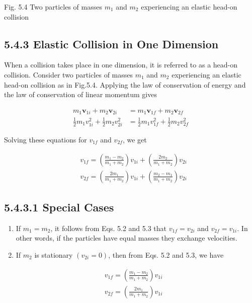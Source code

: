 \documentclass[10pt]{article}
\begin{document}
Fig. 5.4 Two particles of masses $m_{1}$ and $m_{2}$ experiencing an elastic head-on collision

\subsection*{5.4.3 Elastic Collision in One Dimension}
When a collision takes place in one dimension, it is referred to as a head-on collision. Consider two particles of masses $m_{1}$ and $m_{2}$ experiencing an elastic head-on collision as in Fig.5.4. Applying the law of conservation of energy and the law of conservation of linear momentum gives

$$
\begin{aligned}
m_{1} \mathbf{v}_{1 i}+m_{2} \mathbf{v}_{2 i} & =m_{1} \mathbf{v}_{1 f}+m_{2} \mathbf{v}_{2 f} \\
\frac{1}{2} m_{1} v_{1 i}^{2}+\frac{1}{2} m_{2} v_{2 i}^{2} & =\frac{1}{2} m_{1} v_{1 f}^{2}+\frac{1}{2} m_{2} v_{2 f}^{2}
\end{aligned}
$$

Solving these equations for $v_{1 f}$ and $v_{2 f}$, we get


\begin{align*}
& v_{1 f}=\left(\frac{m_{1}-m_{2}}{m_{1}+m_{2}}\right) v_{1 i}+\left(\frac{2 m_{2}}{m_{1}+m_{2}}\right) v_{2 i}  \tag{5.2}\\
& v_{2 f}=\left(\frac{2 m_{1}}{m_{1}+m_{2}}\right) v_{1 i}+\left(\frac{m_{2}-m_{1}}{m_{1}+m_{2}}\right) v_{2 i} \tag{5.3}
\end{align*}


\subsection*{5.4.3.1 Special Cases}
\begin{enumerate}
  \item If $m_{1}=m_{2}$, it follows from Eqs. 5.2 and 5.3 that $v_{1 f}=v_{2 i}$ and $v_{2 f}=v_{1 i}$. In other words, if the particles have equal masses they exchange velocities.
  \item If $m_{2}$ is stationary $\left(v_{2 i}=0\right)$, then from Eqs. 5.2 and 5.3, we have
\end{enumerate}


\begin{align*}
& v_{1 f}=\left(\frac{m_{1}-m_{2}}{m_{1}+m_{2}}\right) v_{1 i}  \tag{5.4}\\
& v_{2 f}=\left(\frac{2 m_{1}}{m_{1}+m_{2}}\right) v_{1 i} \tag{5.5}
\end{align*}
\end{document}

